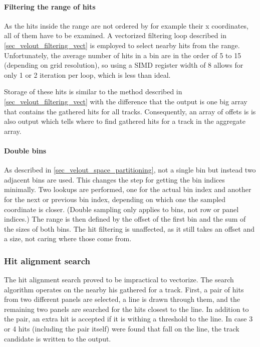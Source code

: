 \documentclass[12pt]{article}
\begin{document}
\paragraph{Filtering the range of hits} \mbox{}\vspace{0.4pc}

As the hits inside the range are not ordered by for example their x coordinates, all of them have to be examined. A vectorized filtering loop described in \ref{sec_velout_filtering_vect} is employed to select nearby hits from the range. Unfortunately, the average number of hits in a bin are in the order of 5 to 15 (depending on grid resolution), so using a SIMD register width of 8 allows for only 1 or 2 iteration per loop, which is less than ideal.

Storage of these hits is similar to the method described in \ref{sec_velout_filtering_vect} with the difference that the output is one big array that contains the gathered hits for all tracks. Consequently, an array of offets is is also output which tells where to find gathered hits for a track in the aggregate array.

\paragraph{Double bins}\mbox{}\vspace{0.4pc}

As described in \ref{sec_velout_space_partitioning}, not a single bin but instead two adjacent bins are used. This changes the step for getting the bin indices minimally. Two lookups are performed, one for the actual bin index and another for the next or previous bin index, depending on which one the sampled coordinate is closer. (Double sampling only applies to bins, not row or panel indices.) The range is then defined by the offset of the first bin and the sum of the sizes of both bins. The hit filtering is unaffected, as it still takes an offset and a size, not caring where those come from.


\subsubsection{Hit alignment search}

The hit alignment search proved to be impractical to vectorize. The search algorithm operates on the nearby his gathered for a track. First, a pair of hits from two different panels are selected, a line is drawn through them, and the remaining two panels are searched for the hits closest to the line. In addition to the pair, an extra hit is accepted if it is withing a threshold to the line. In case 3 or 4 hits (including the pair itself) were found that fall on the line, the track candidate is written to the output.
\end{document}
